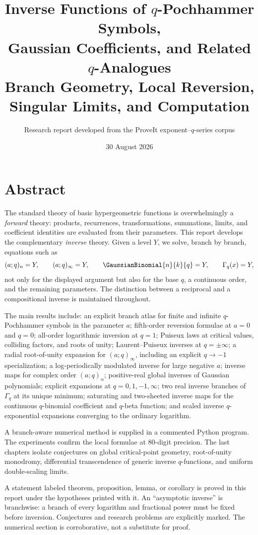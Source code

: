 \documentclass[11pt,a4paper,oneside,openany]{book}
\title{\bfseries Inverse Functions of \texorpdfstring{$q$}{q}-Pochhammer Symbols,\\
Gaussian Coefficients, and Related \texorpdfstring{$q$}{q}-Analogues\\[0.5em]
\large Branch Geometry, Local Reversion, Singular Limits, and Computation}
\author{Research report developed from the ProveIt exponent--\(q\)-series corpus}
\date{30 August 2026}
\theoremstyle{definition}
\theoremstyle{remark}
\begin{document}
\frontmatter
\hypersetup{pageanchor=false}
\maketitle
\hypersetup{pageanchor=true}

\chapter*{Abstract}
The standard theory of basic hypergeometric functions is overwhelmingly a
\emph{forward} theory: products, recurrences, transformations, summations,
limits, and coefficient identities are evaluated from their parameters.
This report develops the complementary \emph{inverse} theory.  Given a level
\(Y\), we solve, branch by branch, equations such as
\[
 (a;q)_n=Y,\qquad (a;q)_\infty=Y,
 \qquad \GaussianBinomial{n}{k}{q}=Y,
 \qquad \Gamma_q(x)=Y,
\]
not only for the displayed argument but also for the base \(q\), a continuous
order, and the remaining parameters.  The distinction between a reciprocal
and a compositional inverse is maintained throughout.

The main results include: an explicit branch atlas for finite and infinite
\(q\)-Pochhammer symbols in the parameter \(a\); fifth-order reversion
formulae at \(a=0\) and \(q=0\); all-order logarithmic inversion at \(q=1\);
Puiseux laws at critical values, colliding factors, and roots of unity;
Laurent--Puiseux inverses at \(q=\pm\infty\); a radial root-of-unity expansion
for \((a;q)_\infty\), including an explicit \(q\to-1\)
specialization; a log-periodically modulated inverse for
large negative \(a\); inverse maps for complex order \((a;q)_\alpha\);
positive-real global inverses of Gaussian polynomials; explicit expansions
at \(q=0,1,-1,\infty\); two real inverse branches of \(\Gamma_q\) at its
unique minimum; saturating and two-sheeted inverse maps for the continuous
\(q\)-binomial coefficient and \(q\)-beta function; and scaled inverse
\(q\)-exponential expansions converging to the ordinary logarithm.

A branch-aware numerical method is supplied in a commented Python program.
The experiments confirm the local formulae at 80-digit precision.  The last
chapters isolate conjectures on global critical-point geometry,
root-of-unity monodromy, differential transcendence of generic inverse
\(q\)-functions, and uniform double-scaling limits.

\begin{statusbox}[title=Scope and status]
A statement labeled theorem, proposition, lemma, or corollary is proved in
this report under the hypotheses printed with it.  An ``asymptotic inverse''
is branchwise: a branch of every logarithm and fractional power must be fixed
before inversion.  Conjectures and research problems are explicitly marked.
The numerical section is corroborative, not a substitute for proof.
\end{statusbox}
\end{document}
